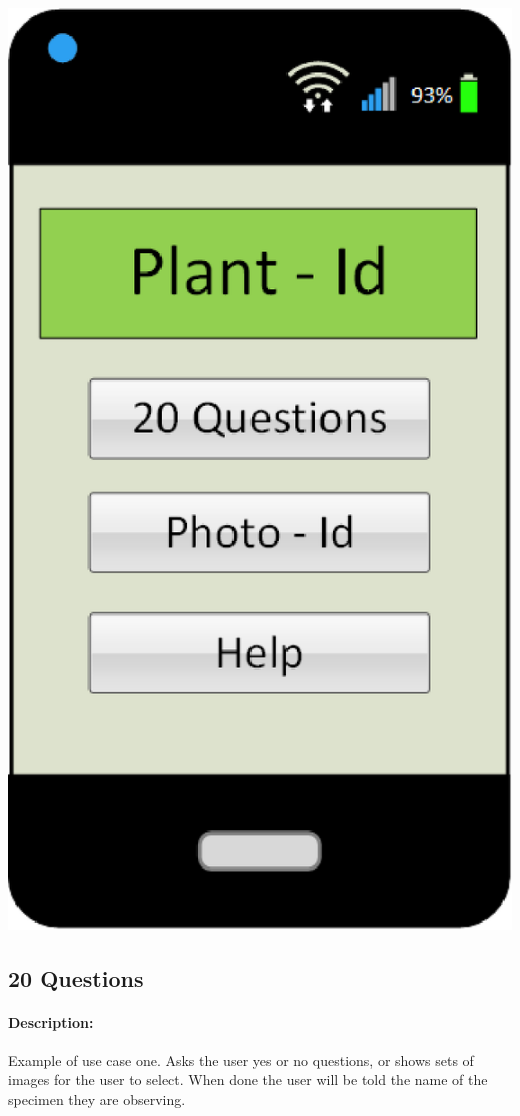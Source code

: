 \documentclass[a4paper]{article}
\begin{document}
\begin{center}\includegraphics[scale=.8]{HomeScreen.eps}\end{center}
\pagebreak
\subsection{20 Questions}
\paragraph{Description:}
Example of use case one. Asks the user yes or no questions, or shows sets of images for the user to select. When done the user will be told the name of the specimen they are observing.
\end{document}
